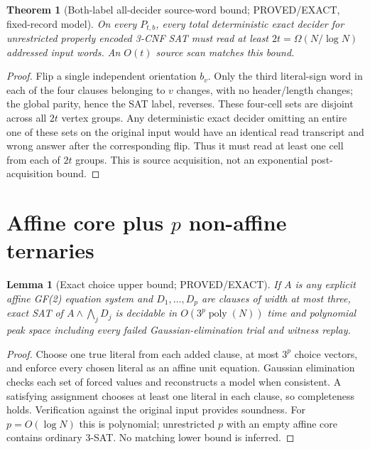 \documentclass[11pt]{article}
\newtheorem{theorem}{Theorem}
\newtheorem{lemma}{Lemma}
\begin{document}
\begin{theorem}[Both-label all-decider source-word bound; PROVED/EXACT, fixed-record model]
On every $P_{t,b}$, every total deterministic exact decider for unrestricted properly encoded 3-CNF SAT must read at least $2t=\Omega(N/\log N)$ addressed input words. An $O(t)$ source scan matches this bound.
\end{theorem}
\begin{proof}
Flip a single independent orientation $b_v$. Only the third literal-sign word in each of the four clauses belonging to $v$ changes, with no header/length changes; the global parity, hence the SAT label, reverses. These four-cell sets are disjoint across all $2t$ vertex groups. Any deterministic exact decider omitting an entire one of these sets on the original input would have an identical read transcript and wrong answer after the corresponding flip. Thus it must read at least one cell from each of $2t$ groups. This is source acquisition, not an exponential post-acquisition bound.
\end{proof}

\section{Affine core plus $p$ non-affine ternaries}
\begin{lemma}[Exact choice upper bound; PROVED/EXACT]
If $A$ is any explicit affine GF(2) equation system and $D_1,\ldots,D_p$ are clauses of width at most three, exact SAT of $A\wedge\bigwedge_jD_j$ is decidable in $O(3^p\operatorname{poly}(N))$ time and polynomial peak space including every failed Gaussian-elimination trial and witness replay.
\end{lemma}
\begin{proof}
Choose one true literal from each added clause, at most $3^p$ choice vectors, and enforce every chosen literal as an affine unit equation. Gaussian elimination checks each set of forced values and reconstructs a model when consistent. A satisfying assignment chooses at least one literal in each clause, so completeness holds. Verification against the original input provides soundness. For $p=O(\log N)$ this is polynomial; unrestricted $p$ with an empty affine core contains ordinary 3-SAT. No matching lower bound is inferred.
\end{proof}
\end{document}

